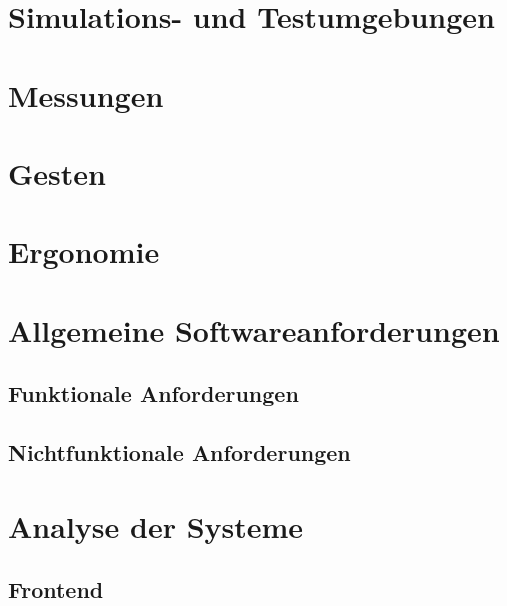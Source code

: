 


\section{Simulations- und Testumgebungen}


\section{Messungen}


\section{Gesten}


\section{Ergonomie}





\section{Allgemeine Softwareanforderungen}


\subsection{Funktionale Anforderungen}


\subsection{Nichtfunktionale Anforderungen}


\section{Analyse der Systeme}


\subsection{Frontend}


